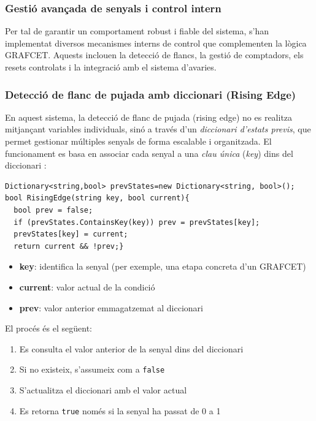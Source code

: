 \documentclass[a4paper,11pt,DIV=13,headings=normal,abstract=true,twoside=semi]{article}
\newcommand{\acro}[1]{\textsc{#1}}
\begin{document}
\subsubsection{Gestió avançada de senyals i control intern}

Per tal de garantir un comportament robust i fiable del sistema, s'han implementat diversos mecanismes interns de control que complementen la lògica \acro{GRAFCET}. Aquests inclouen la detecció de flancs, la gestió de comptadors, els resets controlats i la integració amb el sistema d'avaries.

\subsubsection*{Detecció de flanc de pujada amb diccionari (Rising Edge)}

En aquest sistema, la detecció de flanc de pujada (rising edge) no es realitza mitjançant variables individuals, sinó a través d'un \emph{diccionari d'estats previs}, que permet gestionar múltiples senyals de forma escalable i organitzada. El funcionament es basa en associar cada senyal a una \emph{clau única} (\emph{key}) dins del diccionari \cite{csharp_dictionary}:

\begin{lstlisting}[style=simple]
Dictionary<string,bool> prevStates=new Dictionary<string, bool>();
bool RisingEdge(string key, bool current){
  bool prev = false;
  if (prevStates.ContainsKey(key)) prev = prevStates[key];
  prevStates[key] = current;
  return current && !prev;}
\end{lstlisting}

\begin{itemize}
\item \textbf{key}: identifica la senyal (per exemple, una etapa concreta d'un \acro{GRAFCET})
\item \textbf{current}: valor actual de la condició
\item \textbf{prev}: valor anterior emmagatzemat al diccionari
\end{itemize}

El procés és el següent:

\begin{enumerate}
\item Es consulta el valor anterior de la senyal dins del diccionari
\item Si no existeix, s'assumeix com a \texttt{false}
\item S'actualitza el diccionari amb el valor actual
\item Es retorna \texttt{true} només si la senyal ha passat de 0 a 1
\end{enumerate}
\end{document}
